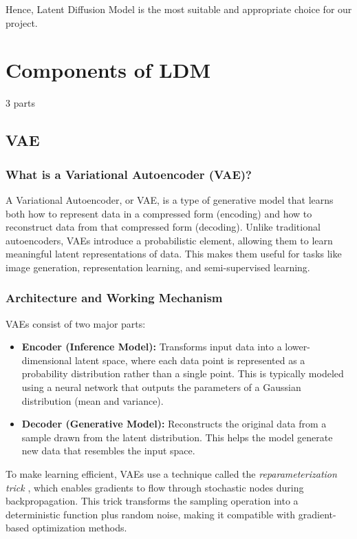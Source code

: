 Hence, Latent Diffusion Model is the most suitable and appropriate choice for our project. 

\section{Components of LDM}

3 parts

\subsection{VAE}

\subsubsection{What is a Variational Autoencoder (VAE)?}
A Variational Autoencoder, or VAE, is a type of generative model that learns both how to represent data in a compressed form (encoding) and how to reconstruct data from that compressed form (decoding). Unlike traditional autoencoders, VAEs introduce a probabilistic element, allowing them to learn meaningful latent representations of data. This makes them useful for tasks like image generation, representation learning, and semi-supervised learning.

\subsubsection{Architecture and Working Mechanism}
VAEs consist of two major parts:
\begin{itemize}
    \item \textbf{Encoder (Inference Model):} Transforms input data into a lower-dimensional latent space, where each data point is represented as a probability distribution rather than a single point. This is typically modeled using a neural network that outputs the parameters of a Gaussian distribution (mean and variance).
    \item \textbf{Decoder (Generative Model):} Reconstructs the original data from a sample drawn from the latent distribution. This helps the model generate new data that resembles the input space.
\end{itemize}

To make learning efficient, VAEs use a technique called the \textit{reparameterization trick} \cite{Kingma_2019}, which enables gradients to flow through stochastic nodes during backpropagation. This trick transforms the sampling operation into a deterministic function plus random noise, making it compatible with gradient-based optimization methods.

